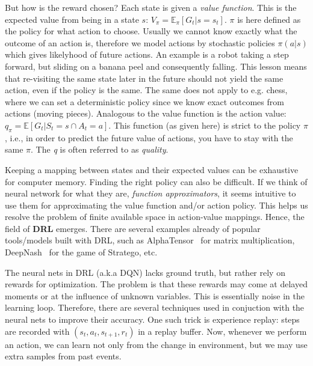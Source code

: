 \documentclass[10pt,twocolumn,letterpaper]{article}
\begin{document}
But how is the reward chosen? Each state is given a \textit{value function}. This is the expected value from being in a state $s$: $V_{\pi} = \mathbb{E}_{\pi} [ G_{t} | s = s_{t}]$. $\pi$ is here defined as the policy for what action to choose. Usually we cannot know exactly what the outcome of an action is, therefore we model actions by stochastic policies $\pi{}(a | s)$ which gives likelyhood of future actions. An example is a robot taking a step forward, but sliding on a banana peel and consequently falling. This lesson means that re-visiting the same state later in the future should not yield the same action, even if the policy is the same. The same does not apply to e.g. chess, where we can set a deterministic policy since we know exact outcomes from actions (moving pieces). 
Analogous to the value function is the action value: $q_{\pi{}} = \mathbb{E} [ G_{t} \vert{} S_{t} = s \cap A_{t} = a]$. This function (as given here) is strict to the policy $\pi$, i.e., in order to predict the future value of actions, you have to stay with the same $\pi$. The \textit{q} is often referred to as \textit{quality}. 



Keeping a mapping between states and their expected values can be exhaustive for computer memory. Finding the right policy can also be difficult. If we think of neural network for what they are, \textit{function approximators}, it seems intuitive to use them for approximating the value function and/or action policy. This helps us resolve the problem of finite available space in action-value mappings. Hence, the field of \textbf{\gls{DRL}} emerges. There are several examples already of popular tools/models built with \gls{DRL}, such as AlphaTensor~\cite{alphaTensor} for matrix multiplication, DeepNash~\cite{stratego} for the game of Stratego, etc. 

The neural nets in \gls{DRL} (a.k.a \gls{DQN}) lacks ground truth, but rather rely on rewards for optimization. The problem is that these rewards may come at delayed moments or at the influence of unknown variables. This is essentially noise in the learning loop. Therefore, there are several techniques used in conjuction with the neural nets to improve their accuracy. One such trick is experience replay: steps are recorded with $(s_{t}, a_{t}, s_{t+1}, r_{t})$ in a replay buffer. Now, whenever we perform an action, we can learn not only from the change in environment, but we may use extra samples from past events.
\end{document}
